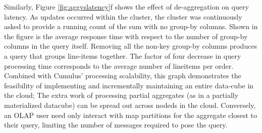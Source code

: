 Similarly, Figure \ref{fig:aggvslatency}f shows the effect of de-aggregation on query latency.  As updates occurred within the cluster, the cluster was continuously asked to provide a running count of the sum with no group-by columns.  Shown in the figure is the average response time with respect to the number of group-by columns in the query itself.  Removing all the non-key group-by columns produces a query that groups line-items together.  The factor of four decrease in query processing time corresponds to the average number of lineitems per order.  Combined with Cumulus' processing scalability, this graph demonstrates the feasibility of implementing and incrementally maintaining an entire data-cube in the cloud; The extra work of processing partial aggregates (as in a partially materialized datacube) can be spread out across nodeds in the cloud.  Conversely, an OLAP user need only interact with map partitions for the aggregate closest to their query, limiting the number of messages required to pose the query.


